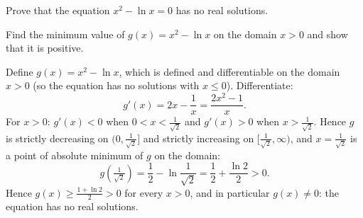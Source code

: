 
\begin{question}
Prove that the equation $x^2-\ln x=0$ has no real solutions.
\end{question}

\begin{hint}
Find the minimum value of $g(x)=x^2-\ln x$ on the domain $x>0$ and show that it is positive.
\end{hint}

\begin{solution}
Define $g(x)=x^2-\ln x$, which is defined and differentiable on the domain $x>0$ (so the equation has no solutions with $x\le0$). Differentiate:
\[ g'(x)=2x-\frac1x=\frac{2x^2-1}{x}. \]
For $x>0$: $g'(x)<0$ when $0<x<\frac{1}{\sqrt2}$ and $g'(x)>0$ when $x>\frac1{\sqrt2}$. Hence $g$ is strictly decreasing on $(0,\frac1{\sqrt2}]$ and strictly increasing on $[\frac1{\sqrt2},\infty)$, and $x=\frac1{\sqrt2}$ is a point of absolute minimum of $g$ on the domain:
\[ g\!\left(\tfrac1{\sqrt2}\right)=\frac12-\ln\frac1{\sqrt2}=\frac12+\frac{\ln2}{2}>0. \]
Hence $g(x)\ge\frac{1+\ln 2}{2}>0$ for every $x>0$, and in particular $g(x)\ne0$: the equation has no real solutions.
\end{solution}
